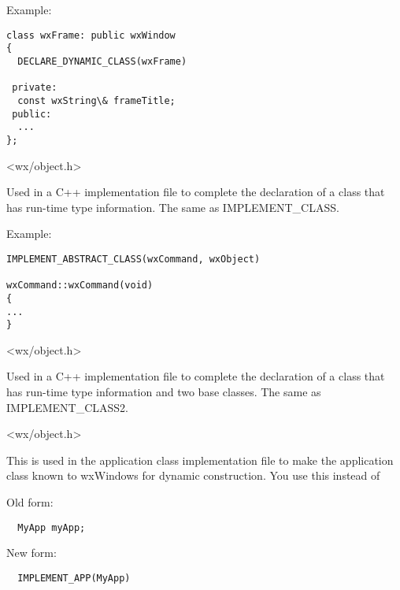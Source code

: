 Example:

\begin{verbatim}
class wxFrame: public wxWindow
{
  DECLARE_DYNAMIC_CLASS(wxFrame)

 private:
  const wxString\& frameTitle;
 public:
  ...
};
\end{verbatim}


<wx/object.h>



Used in a C++ implementation file to complete the declaration of
a class that has run-time type information. The same as IMPLEMENT\_CLASS.

Example:

\begin{verbatim}
IMPLEMENT_ABSTRACT_CLASS(wxCommand, wxObject)

wxCommand::wxCommand(void)
{
...
}
\end{verbatim}


<wx/object.h>



Used in a C++ implementation file to complete the declaration of
a class that has run-time type information and two base classes. The same as IMPLEMENT\_CLASS2.


<wx/object.h>

\label{implementapp}


This is used in the application class implementation file to make the application class known to
wxWindows for dynamic construction. You use this instead of

Old form:

\begin{verbatim}
  MyApp myApp;
\end{verbatim}

New form:

\begin{verbatim}
  IMPLEMENT_APP(MyApp)
\end{verbatim}

